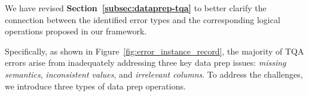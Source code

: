 %

We have revised \textbf{Section~\ref{subsec:dataprep-tqa}} to better clarify the connection between the identified error types and the corresponding logical operations proposed in our framework. 


Specifically, as shown in Figure~\ref{fig:error_instance_record}, the majority of TQA errors arise from inadequately addressing three key data prep issues: \emph{missing semantics}, \emph{inconsistent values}, and \emph{irrelevant columns}. To address the challenges, we introduce three types of data prep operations.


